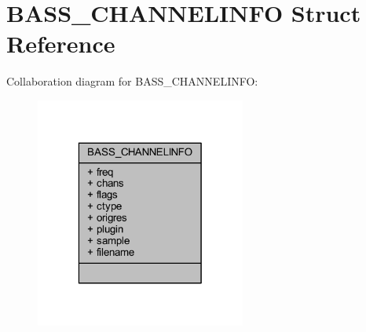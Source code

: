 \hypertarget{struct_b_a_s_s___c_h_a_n_n_e_l_i_n_f_o}{\section{B\-A\-S\-S\-\_\-\-C\-H\-A\-N\-N\-E\-L\-I\-N\-F\-O Struct Reference}
\label{struct_b_a_s_s___c_h_a_n_n_e_l_i_n_f_o}
}


Collaboration diagram for B\-A\-S\-S\-\_\-\-C\-H\-A\-N\-N\-E\-L\-I\-N\-F\-O\-:\nopagebreak
\begin{figure}[H]
\begin{center}
\leavevmode
\includegraphics[width=196pt]{struct_b_a_s_s___c_h_a_n_n_e_l_i_n_f_o__coll__graph}
\end{center}
\end{figure}
